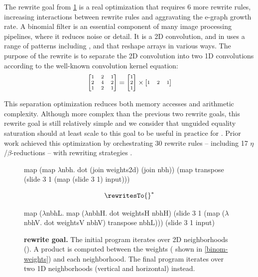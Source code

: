 \def\binomial {\goalStyle{binomial}}
The \binomial{} rewrite goal from \cref{fig:binom-rewrite} is a real optimization that requires 6 more rewrite rules, increasing interactions between rewrite rules and aggravating the e-graph growth rate.
A binomial filter is an essential component of many image processing pipelines, where it reduces noise or detail.
It is a 2D convolution, and in \Rise{} uses a range of patterns including ,  and  that reshape arrays in various ways.
The purpose of the rewrite is to separate the 2D convolution into two 1D convolutions according to the well-known convolution kernel equation:
\begin{equation*}\label{binom-weights}
\scriptsize
    \left[\begin{matrix}
        1 & 2 & 1 \\
        2 & 4 & 2 \\
        1 & 2 & 1 \\
    \end{matrix}\right]
    =
    \left[\begin{matrix}
        1 \\
        2 \\
        1 \\
    \end{matrix}\right]
    \times
    \left[\begin{matrix}
        1 & 2 & 1 \\
    \end{matrix}\right]
\end{equation*}


This separation optimization reduces both memory accesses and arithmetic complexity.
Although more complex than the previous two rewrite goals, this rewrite goal is still relatively simple and we consider that unguided equality saturation should at least scale to this goal to be useful in practice for \Rise{}.
Prior work achieved this optimization by orchestrating 30 rewrite rules -- including 17 $\eta$/$\beta$-reductions -- with \Elevate{} rewriting strategies \cite{koehler2021-elevate-imgproc}.


\begin{figure}
  \begin{rise}
map (map $\lambda$nbh. dot (join weights2d) (join nbh))
  (map transpose (slide 3 1 (map (slide 3 1) input)))
  \end{rise}
  $$ \rewritesTo{}^* $$
  \begin{rise}
map ($\lambda$nbhL. map ($\lambda$nbhH. dot weightsH nbhH)
    (slide 3 1 (map ($\lambda$nbhV. dot weightsV nbhV) transpose nbhL))) (slide 3 1 input)
  \end{rise}
  \caption{\textbf{\binomial{} rewrite goal.}
  The initial \Rise{} program iterates over 2D neighborhoods ().
  A  product is computed between the weights ( shown in \cref{binom-weights}) and each neighborhood.
  The final program iterates over two 1D neighborhoods (vertical and horizontal) instead.}
  \label{fig:binom-rewrite}
\end{figure}

